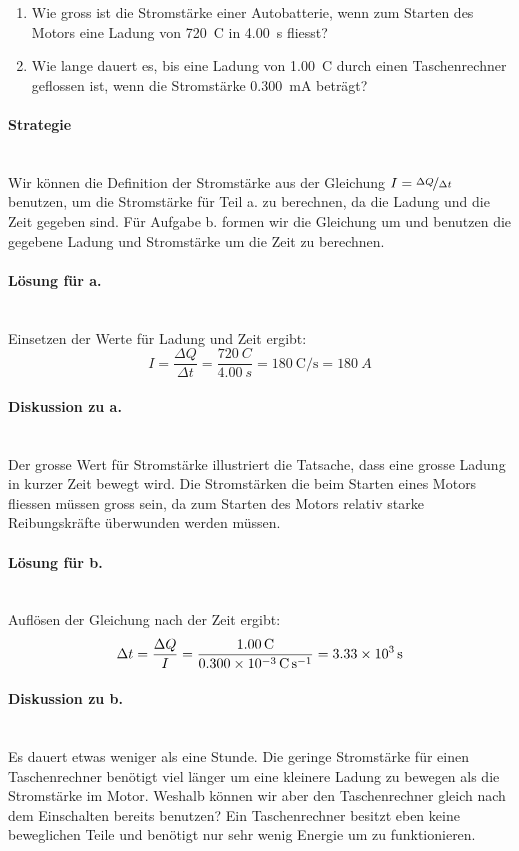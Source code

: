 \documentclass[11pt,twoside=false,open=any]{scrbook}
\begin{document}
\begin{tcolorbox}[colback=white, title=Beispiel: Berechnung von Stromstärken]
\begin{enumerate}
    \item Wie gross ist die Stromstärke einer Autobatterie, wenn zum  Starten des Motors eine Ladung von \SI{720}{C} in \SI{4.00}{s} fliesst?
    
    \item Wie lange dauert es, bis eine Ladung von \SI{1.00}{\coulomb} durch einen Taschenrechner geflossen ist, wenn die Stromstärke \SI{0.300}{\milli \ampere} beträgt?
    \end{enumerate}
\paragraph{Strategie}\mbox{}\\
    Wir können die Definition der Stromstärke aus der Gleichung $I=\nicefrac{\Delta Q}{\Delta t}$ benutzen, um die Stromstärke für Teil a. zu berechnen, da die Ladung und die Zeit gegeben sind.
    Für Aufgabe b. formen wir die Gleichung um und benutzen die gegebene Ladung und Stromstärke um die Zeit zu berechnen. 
\paragraph{Lösung für a.}\mbox{}\\
    Einsetzen der Werte für Ladung und Zeit ergibt:
    \[ I = \frac{\Delta Q}{\Delta t} = \frac{\SI{720}{C}}{\SI{4.00}{s}} = \SI{180}{\coulomb \per \second} = \SI{180}{A} \]
\paragraph{Diskussion zu a.}\mbox{}\\
    Der grosse Wert für Stromstärke illustriert die Tatsache, dass eine grosse Ladung in kurzer Zeit bewegt wird. Die Stromstärken die beim Starten eines Motors fliessen müssen gross sein, da zum Starten des Motors relativ starke Reibungskräfte überwunden werden müssen.
\paragraph{Lösung für b.}\mbox{}\\
    Auflösen der Gleichung nach der Zeit ergibt:
    \[ \Delta t = \frac{\Delta Q}{I} = \frac{\SI{1.00}{C}}{\SI{0.300E-3}{\coulomb \per \second}} = \SI{3.33E3}{s} \]
\paragraph{Diskussion zu b.}\mbox{}\\
    Es dauert etwas weniger als eine Stunde. Die geringe Stromstärke für einen Taschenrechner benötigt viel länger um eine kleinere Ladung zu bewegen als die Stromstärke im Motor. Weshalb können wir aber den Taschenrechner gleich nach dem Einschalten bereits benutzen? Ein Taschenrechner besitzt eben keine beweglichen Teile und benötigt nur sehr wenig Energie um zu funktionieren.
\end{tcolorbox}
\end{document}
